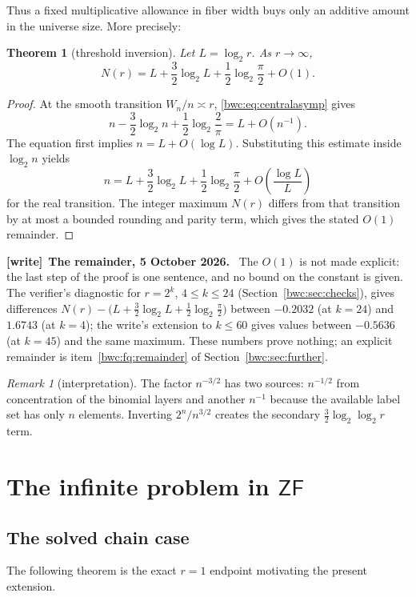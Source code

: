 \documentclass[11pt,letterpaper]{article}
\numberwithin{equation}{section}
\theoremstyle{plain}
\newtheorem{theorem}{Theorem}[section]
\theoremstyle{definition}
\theoremstyle{remark}
\newtheorem{remark}[remark]{Remark}
\newcommand{\ZF}{\mathsf{ZF}}
\newenvironment{writenote}[1][]{\par\smallskip\begingroup\small
 \noindent\textbf{[write]}\if\relax\detokenize{#1}\relax\else~\textbf{#1.}\fi\ }%
 {\par\endgroup\smallskip}
\begin{document}
Thus a fixed multiplicative allowance in fiber width buys only an additive
amount in the universe size.  More precisely:

\begin{theorem}[threshold inversion]\label{bwc:thm:thresholdasymp}
Let $L=\log_2 r$.  As $r\to\infty$,
\[
 N(r)=L+\frac32\log_2 L+\frac12\log_2\!\frac\pi2+O(1).
\]
\end{theorem}

\begin{proof}
At the smooth transition $W_n/n\asymp r$, \cref{bwc:eq:centralasymp} gives
\[
 n-\frac32\log_2 n+\frac12\log_2\frac2\pi
      =L+O(n^{-1}).
\]
The equation first implies $n=L+O(\log L)$.  Substituting this estimate inside
$\log_2 n$ yields
\[
 n=L+\frac32\log_2 L+\frac12\log_2\frac\pi2
       +O\!\left(\frac{\log L}{L}\right)
\]
for the real transition.  The integer maximum $N(r)$ differs from that
transition by at most a bounded rounding and parity term, which gives the
stated $O(1)$ remainder.
\end{proof}

\begin{writenote}[The remainder, 5 October 2026]
The $O(1)$ is not made explicit: the last step of the proof is one sentence,
and no bound on the constant is given. The verifier's diagnostic for
$r=2^k$, $4\leq k\leq24$ (Section~\ref{bwc:sec:checks}), gives differences
$N(r)-\bigl(L+\tfrac32\log_2L+\tfrac12\log_2\tfrac\pi2\bigr)$ between
$-0.2032$ (at $k=24$) and $1.6743$ (at $k=4$); the write's extension to
$k\leq60$ gives values between $-0.5636$ (at $k=45$) and the same maximum. These numbers prove nothing; an
explicit remainder is item~\ref{bwc:fq:remainder} of
Section~\ref{bwc:sec:further}.
\end{writenote}

\begin{remark}[interpretation]
The factor $n^{-3/2}$ has two sources: $n^{-1/2}$ from concentration of the
binomial layers and another $n^{-1}$ because the available label set has only
$n$ elements.  Inverting $2^n/n^{3/2}$ creates the secondary
$\tfrac32\log_2\log_2 r$ term.
\end{remark}

\section{The infinite problem in \texorpdfstring{$\ZF$}{ZF}}\label{bwc:sec:infinite}

\subsection{The solved chain case}
The following theorem is the exact $r=1$ endpoint motivating the present
extension.
\end{document}
